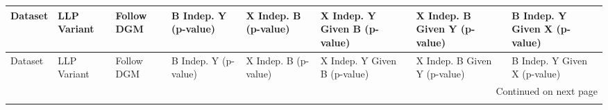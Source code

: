 \begin{longtable}{llllllll}
\toprule
                                                                                Dataset &  LLP Variant &  Follow DGM & B Indep. Y (p-value) & X Indep. B (p-value) & X Indep. Y Given B (p-value) & X Indep. B Given Y (p-value) & B Indep. Y Given X (p-value) \\
\midrule
\endfirsthead

\toprule
                                                                                Dataset &  LLP Variant &  Follow DGM & B Indep. Y (p-value) & X Indep. B (p-value) & X Indep. Y Given B (p-value) & X Indep. B Given Y (p-value) & B Indep. Y Given X (p-value) \\
\midrule
\endhead
\midrule
\multicolumn{8}{r}{{Continued on next page}} \\
\midrule
\endfoot


\end{longtable}
